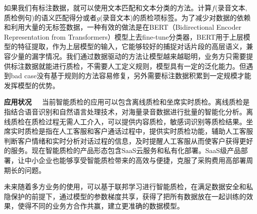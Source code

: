 如果我们有标注数据，就可以使用文本匹配和文本分类的方法。计算$f$(录音文本,质检例句)的语义匹配得分或者$g$(录音文本)的质检项标签。为了减少对数据的依赖和利用大量的无标签数据，一种有效的做法是在BERT（Bidirectional Encoder Representation from Transformers）模型上去fine-tune分类器，BERT用于上层模型的特征提取，作为上层模型的输入，它能够较好的捕捉对话片段的高层语义，兼容少量的漏字情况。我们通过数据驱动的方法让模型越来越聪明，业务方只需要提供标注数据就能进行质检，不需要人工定义规则，模型具有一定的泛化能力。但遇到bad case没有基于规则的方法容易修复，另外需要标注数据积累到一定规模才能发挥模型的优势。

\textbf{应用状况}~~~当前智能质检的应用可以包含离线质检和坐席实时质检。离线质检是指结合语音识别和自然语言处理技术，对海量录音数据进行批量的智能化分析。离线质检在质检过程无需人工介入，可以提供内容质检，敏感词识别等质检结果。坐席实时质检是指在人工客服和客户通话过程中，提供实时质检功能，辅助人工客服判断客户情绪和实时分析对话过程的信息，及时提醒人工客服从而使客户获得更好的服务。现在智能质检的产品形态包含SaaS云服务和私有化部署。SaaS级产品部署，让中小企业也能够享受智能质检带来的高效与便捷，克服了采购费用高部署周期长的问题。

未来随着多方业务的使用，可以基于联邦学习进行智能质检，在满足数据安全和私隐保护的前提下，通过模型的参数梯度共享，获得了把所有数据放在一起训练的效果，使得不同的业务方合作共赢，建立更准确的数据模型。

